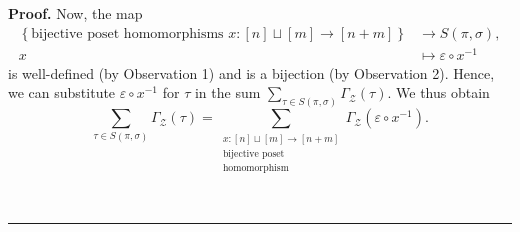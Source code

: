 \documentclass[numbers=enddot,12pt,final,onecolumn,notitlepage]{scrartcl}%
\theoremstyle{definition}
\newenvironment{proof}[1][Proof]{\noindent\textbf{#1.} }{\ \rule{0.5em}{0.5em}}
\let\sumnonlimits\sum
\renewcommand{\sum}{\sumnonlimits\limits}
\begin{document}
\begin{proof}
Now, the map%
\begin{align*}
\left\{  \text{bijective poset homomorphisms }x:\left[  n\right]
\sqcup\left[  m\right]  \rightarrow\left[  n+m\right]  \right\}   &
\rightarrow S\left(  \pi,\sigma\right)  ,\\
x  &  \mapsto\varepsilon\circ x^{-1}%
\end{align*}
is well-defined (by Observation 1) and is a bijection (by Observation 2).
Hence, we can substitute $\varepsilon\circ x^{-1}$ for $\tau$ in the sum
$\sum_{\tau\in S\left(  \pi,\sigma\right)  }\Gamma_{\mathcal{Z}}\left(
\tau\right)  $. We thus obtain%
\begin{equation}
\sum_{\tau\in S\left(  \pi,\sigma\right)  }\Gamma_{\mathcal{Z}}\left(
\tau\right)  =\sum_{\substack{x:\left[  n\right]  \sqcup\left[  m\right]
\rightarrow\left[  n+m\right]  \\\text{bijective poset}\\\text{homomorphism}%
}}\Gamma_{\mathcal{Z}}\left(  \varepsilon\circ x^{-1}\right)  .
\label{pf.cor.prod2.sum=sum}%
\end{equation}



\end{proof}
\end{document}
